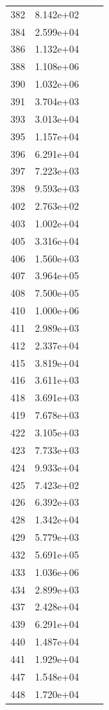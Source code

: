\documentclass[12pt]{article}
\begin{document}
\begin{longtable}{@{}cccc@{}}
382 & 8.142e+02 &  &  \\
384 & 2.599e+04 &  &  \\
386 & 1.132e+04 &  &  \\
388 & 1.108e+06 &  &  \\
390 & 1.032e+06 &  &  \\
391 & 3.704e+03 &  &  \\
393 & 3.013e+04 &  &  \\
395 & 1.157e+04 &  &  \\
396 & 6.291e+04 &  &  \\
397 & 7.223e+03 &  &  \\
398 & 9.593e+03 &  &  \\
402 & 2.763e+02 &  &  \\
403 & 1.002e+04 &  &  \\
405 & 3.316e+04 &  &  \\
406 & 1.560e+03 &  &  \\
407 & 3.964e+05 &  &  \\
408 & 7.500e+05 &  &  \\
410 & 1.000e+06 &  &  \\
411 & 2.989e+03 &  &  \\
412 & 2.337e+04 &  &  \\
415 & 3.819e+04 &  &  \\
416 & 3.611e+03 &  &  \\
418 & 3.691e+03 &  &  \\
419 & 7.678e+03 &  &  \\
422 & 3.105e+03 &  &  \\
423 & 7.733e+03 &  &  \\
424 & 9.933e+04 &  &  \\
425 & 7.423e+02 &  &  \\
426 & 6.392e+03 &  &  \\
428 & 1.342e+04 &  &  \\
429 & 5.779e+03 &  &  \\
432 & 5.691e+05 &  &  \\
433 & 1.036e+06 &  &  \\
434 & 2.899e+03 &  &  \\
437 & 2.428e+04 &  &  \\
439 & 6.291e+04 &  &  \\
440 & 1.487e+04 &  &  \\
441 & 1.929e+04 &  &  \\
447 & 1.548e+04 &  &  \\
448 & 1.720e+04 &  &  \\

\end{longtable}
\end{document}
